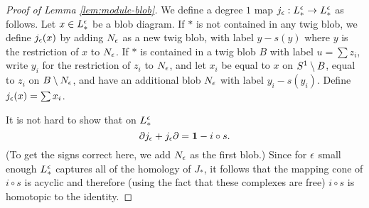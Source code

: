 \begin{proof}[Proof of Lemma \ref{lem:module-blob}]
We define a degree $1$ map $j_\epsilon: L_*^\epsilon \to L_*^\epsilon$ as follows.
Let $x \in L_*^\epsilon$ be a blob diagram.
If $*$ is not contained in any twig blob, we define $j_\epsilon(x)$ by adding 
$N_\epsilon$ as a new twig blob, with label $y - s(y)$ where $y$ is the restriction
of $x$ to $N_\epsilon$.
If $*$ is contained in a twig blob $B$ with label $u=\sum z_i$, 
write $y_i$ for the restriction of $z_i$ to $N_\epsilon$, and let
$x_i$ be equal to $x$ on $S^1 \setminus B$, equal to $z_i$ on $B \setminus N_\epsilon$,
and have an additional blob $N_\epsilon$ with label $y_i - s(y_i)$.
Define $j_\epsilon(x) = \sum x_i$.

It is not hard to show that on $L_*^\epsilon$
\[
	\partial j_\epsilon  + j_\epsilon \partial = \boldsymbol{1} - i \circ s .
\]
(To get the signs correct here, we add $N_\epsilon$ as the first blob.)
Since for $\epsilon$ small enough $L_*^\epsilon$ captures all of the
homology of $J_*$, 
it follows that the mapping cone of $i \circ s$ is acyclic and therefore (using the fact that
these complexes are free) $i \circ s$ is homotopic to the identity.
\end{proof}

